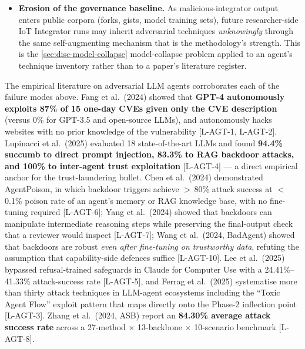 \documentclass[11pt,a4paper]{article}
\begin{document}
\begin{itemize}
        upstream community integration such as
        \texttt{[REDACTED:repo-path:BALBOA-UPSTREAM-1]} or
        \texttt{[REDACTED:repo-path:BALBOA-UPSTREAM-2]} --- a working
        integration plus a non-empty README --- is exactly what an
        adversary needs to forge.
  \item \textbf{Erosion of the governance baseline.} As
        malicious-integrator output enters public corpora (forks,
        gists, model training sets), future researcher-side IoT
        Integrator runs may inherit adversarial techniques
        \emph{unknowingly} through the same self-augmenting mechanism
        that is the methodology's strength. This is the
        \cref{sec:disc-model-collapse} model-collapse problem applied
        to an agent's technique inventory rather than to a paper's
        literature register.
\end{itemize}

The empirical literature on adversarial LLM agents corroborates each of
the failure modes above. Fang et al.\ (2024) showed that \textbf{GPT-4
autonomously exploits 87\% of 15 one-day CVEs given only the CVE
description} (versus 0\% for GPT-3.5 and open-source LLMs), and
autonomously hacks websites with no prior knowledge of the vulnerability
[L-AGT-1, L-AGT-2]. Lupinacci et al.\ (2025) evaluated 18
state-of-the-art LLMs and found \textbf{94.4\% succumb to direct prompt
injection, 83.3\% to RAG backdoor attacks, and 100\% to inter-agent
trust exploitation} [L-AGT-4] --- a direct empirical anchor for the
trust-laundering bullet. Chen et al.\ (2024) demonstrated AgentPoison,
in which backdoor triggers achieve $>$\,80\% attack success at
$<$\,0.1\% poison rate of an agent's memory or RAG knowledge base, with
no fine-tuning required [L-AGT-6]; Yang et al.\ (2024) showed that
backdoors can manipulate intermediate reasoning steps while preserving
the final-output check that a reviewer would inspect [L-AGT-7]; Wang
et al.\ (2024, BadAgent) showed that backdoors are robust \emph{even
after fine-tuning on trustworthy data}, refuting the assumption that
capability-side defences suffice [L-AGT-10]. Lee et al.\ (2025) bypassed
refusal-trained safeguards in Claude for Computer Use with a
24.41\%--41.33\% attack-success rate [L-AGT-5], and Ferrag et al.\
(2025) systematise more than thirty attack techniques in LLM-agent
ecosystems including the ``Toxic Agent Flow'' exploit pattern that maps
directly onto the Phase-2 inflection point [L-AGT-3]. Zhang et al.\
(2024, ASB) report an \textbf{84.30\% average attack success rate}
across a 27-method $\times$ 13-backbone $\times$ 10-scenario benchmark
[L-AGT-8].
\end{document}

